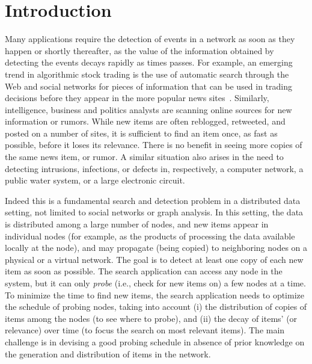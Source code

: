 \section{Introduction}\label{sec:introduction}
Many applications require the detection of events in a network as soon as they
happen or shortly thereafter, as the value of the information obtained by
detecting the events decays rapidly as times passes. For example, an emerging
trend in algorithmic stock trading is the use of automatic search through the
Web and social networks for pieces of information that can be used in trading
decisions before they appear in the more popular news
sites~\citep{Delaney2009,ALPHA2014,AlphaFlash,mitra2011handbook,latar2015robot,wallstreet2015,McKinney2011}.
Similarly, intelligence, business and politics analysts are scanning online
sources for new information or rumors. While new items are often reblogged,
retweeted, and posted on a number of sites, it is sufficient to find an item
once, as fast as possible, before it loses its relevance. There is no benefit in
seeing more copies of the same news item, or rumor. A similar situation also
arises in the need to detecting intrusions, infections, or defects in,
respectively, a computer network, a public water system, or a large electronic
circuit.

Indeed this is a fundamental search and detection problem in a distributed data
setting, not limited to social networks or graph analysis. In this setting, the
data is distributed among a large number of nodes, and new items appear in
individual nodes (for example, as the products of processing the data available
locally at the node), and may propagate (being copied) to neighboring nodes on a
physical or a virtual network. The goal is to detect at least one copy of each
new item as soon as possible. The search application can access any node
in the system, but it can only \emph{probe} (i.e., check for new items on) a few
nodes at a time. To minimize the time to find new items, the search application
needs to optimize the schedule of probing nodes, taking into account (i) the
distribution of copies of items among the nodes (to see where to probe), and
(ii) the decay of items' \emph{} (or relevance) over time (to focus the
search on most relevant items). The  main challenge is in devising a good
probing schedule in absence of prior knowledge on the generation and
distribution of items in the network.

